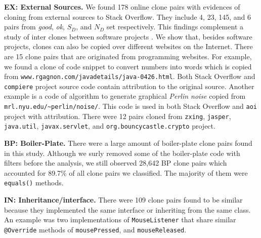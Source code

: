 \documentclass[sigconf,review, anonymous]{acmart}
\begin{document}
\textbf{EX: External Sources.} We found 178 online clone pairs with evidences of cloning from external sources to Stack Overflow. They include 4, 23, 145, and 6 pairs from \textit{good}, \textit{ok}, $S_D$, and $N_D$ set respectively.
This findings complement a study of inter clones between software projects \cite{Svajlenko2014}. We show that, besides software projects, clones can also be copied over different websites on the Internet. There are 15 clone pairs that are originated from programming websites. For example, we found a clone of code snippet to convert numbers into words which is copied from {\small{\texttt{www.rgagnon.com/javadetails/java-0426.html}}}. Both Stack Overflow and \texttt{compiere} project source code contain attribution to the original source. Another example is a code of algorithm to generate graphical \textit{Perlin noise} copied from {\small{\texttt{mrl.nyu.edu/\textasciitilde perlin/noise/}}}. This code is used in both Stack Overflow and \texttt{aoi} project with attribution. %
There were 12 pairs cloned from {\small{\texttt{zxing}}}, {\small{\texttt{jasper}}}, {\small{\texttt{java.util}}}, {\small{\texttt{javax.servlet}}}, and {\small{\texttt{org.bouncycastle.crypto}}} project.

\textbf{BP: Boiler-Plate.} There were a large amount of boiler-plate clone pairs found in this study. Although we surly removed some of the boiler-plate code with filters before the analysis, we still observed 28,642 BP clone pairs which accounted for 89.7\% of all clone pairs we classified. The majority of them were {\small{\texttt{equals()}}} methods.

\textbf{IN: Inheritance/interface.} There were 109 clone pairs found to be similar because they implemented the same interface or inheriting from the same class. An example was two implementations of {\small{\texttt{MouseListener}}} that share similar {\small{\texttt{@Override}}} methods of {\small{\texttt{mousePressed}}}, and {\small{\texttt{mouseReleased}}}. 
\end{document}
